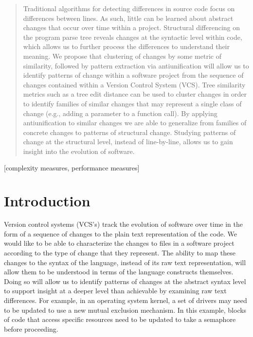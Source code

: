\documentclass{acm_proc_article-sp}
\begin{document}
\maketitle
\begin{abstract}

Traditional algorithms for detecting differences in source code focus on
differences between lines.  As such, little can be learned about abstract
changes that occur over time within a project.  Structural differencing on the
program parse tree reveals changes at the syntactic level within code, which
allows us to further process the differences to understand their meaning. We
propose that clustering of changes by some metric of similarity, followed by
pattern extraction via antiunification will allow us to identify patterns of
change  within a software project from the sequence of changes contained
within a Version Control System (VCS). Tree similarity metrics such as a tree
edit distance can be used to cluster changes in order to identify families of
similar changes that may represent a single class of change (e.g., adding a
parameter to a function call). By applying antiunification to similar changes
we are able to generalize from families of concrete changes to patterns of
structural change. Studying patterns of change at the structural level,
instead of line-by-line, allows us to gain insight into the evolution of
software.

\end{abstract}

[complexity measures, performance measures]



\section{Introduction}

Version control systems (VCS's) track the evolution of software over time in the form
of a sequence of changes to the plain text representation of the code.
We would like to be able to characterize the changes to files in a software
project according to the type of change that they represent.  The ability to
map these changes to the syntax of the language, instead of its raw text
representation, will allow them to be understood in terms of the language
constructs themselves.  Doing so will allow us to identify patterns of
changes at the abstract syntax level to support insight at a deeper level
than achievable by examining raw text differences.  For example, in
an operating system kernel, a set of drivers may need to be updated to use a
new mutual exclusion mechanism. In this example, blocks of code that access
specific resources need to be updated to take a semaphore before proceeding.
\end{document}
